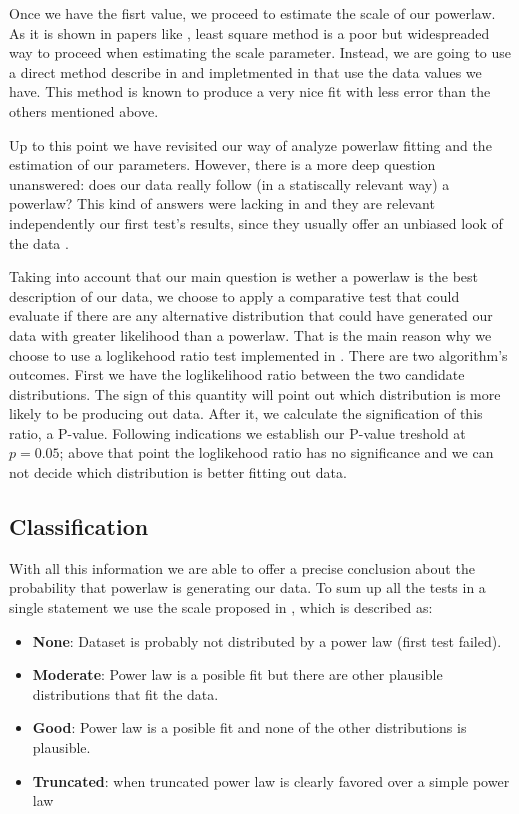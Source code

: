 \documentclass[conference]{IEEEtran}
\begin{document}
Once we have the fisrt value, we proceed to estimate the scale of our powerlaw.
As it is shown in papers like \cite{newman2005power, clauset2009power},
least square method is a poor but widespreaded way to proceed when estimating the
scale parameter. Instead, we are going to use a direct method describe in
\cite{clauset2009power} and impletmented in \cite{alstott2014powerlaw} that use
the data values we have. This method is known to produce a very nice fit with
less error than the others mentioned above.

Up to this point we have revisited our way of analyze powerlaw fitting and
the estimation of our parameters. However, there is a more deep question unanswered:
does our data really follow (in a statiscally relevant way) a powerlaw?
This kind of answers were lacking in \cite{merelo2017self} and they are relevant
independently our first test's results, since they usually offer an unbiased look of the data . 

Taking into account that our main question is wether a powerlaw is the best 
description of our data, we choose to apply a comparative test that could 
evaluate if there are any alternative distribution that could have generated
our data with greater likelihood than a powerlaw. That is the main reason why
we choose to use a loglikehood ratio test implemented in \cite{alstott2014powerlaw}.
There are two algorithm's outcomes. First we have the loglikelihood ratio between the 
two  candidate  distributions. The sign of this quantity will point out which
distribution is more likely to be producing out data. After it, we calculate the signification 
of this ratio, a P-value. Following \cite{alstott2014powerlaw} indications we establish our P-value treshold at $p=0.05$;
above that point the loglikehood ratio has no significance and we can not decide which distribution
is better fitting out data.

\subsection{Classification}

With all this information we are able to offer a precise conclusion about the 
probability that powerlaw is generating our data. To sum up all the tests in a single 
statement we use the scale proposed in \cite{clauset2009power}, which is described as:
\begin{itemize}
	\item \textbf{None}: Dataset is probably not distributed by a power law (first test failed).   
	\item \textbf{Moderate}: Power law is a posible fit but there are other plausible distributions that fit the data.
	\item \textbf{Good}: Power law is a posible fit and none of the other distributions is plausible.
	\item \textbf{Truncated}: when truncated power law is clearly favored over a simple power law
\end{itemize}
\end{document}
